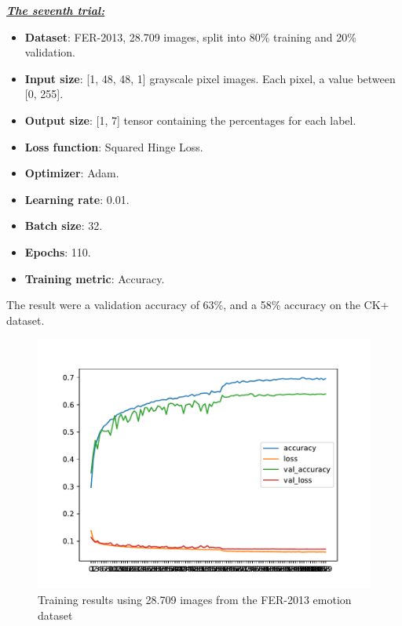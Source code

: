 \documentclass[runningheads,a4paper,11pt]{report}
\begin{document}
\clearpage
\underline{\textbf{\emph{The seventh trial:}}}
\begin{itemize}
	\item \textbf{Dataset}: FER-2013, 28.709 images, split into 80\% training and 20\% validation.
	\item \textbf{Input size}: [1, 48, 48, 1] grayscale pixel images. Each pixel, a value between [0, 255].
	\item \textbf{Output size}: [1, 7] tensor containing the percentages for each label.
	\item \textbf{Loss function}: Squared Hinge Loss.
	\item \textbf{Optimizer}: Adam.
	\item \textbf{Learning rate}: 0.01.
	\item \textbf{Batch size}: 32.
	\item \textbf{Epochs}: 110.
	\item \textbf{Training metric}: Accuracy.
\end{itemize}
The result were a validation accuracy of 63\%, and a 58\% accuracy on the CK+ dataset.
\begin{figure}[htbp]
\begin{center}
	\includegraphics[scale=0.8]{Fig/fer_training_28k_001_squared_hinge_loss.pdf}
	\caption{Training results using 28.709 images from the FER-2013 emotion dataset}
	\label{fer_training_28k_001_squared_hinge_loss}
\end{center}
\end{figure}
\end{document}
